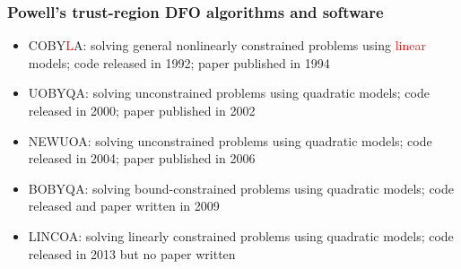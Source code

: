 \documentclass[slidestop,mathserif,xcolor=dvipsnames]{beamer}
\newcommand{\blue}[1]{\textcolor{blue}{#1}}
\newcommand{\red}[1]{\textcolor{red}{#1}}
\begin{document}
\begin{frame}
  \frametitle{Powell's trust-region DFO algorithms and software}

      \begin{itemize}
          \item  COBY\red{L}A: solving general nonlinearly constrained problems using \red{linear} models; code released in 1992; paper published in 1994
      \vspace{0.5ex}

    \item  UOBYQA: solving unconstrained problems using quadratic models; code released in 2000; paper published in 2002
      \vspace{0.5ex}

    \item  NEWUOA: solving unconstrained problems using quadratic models; code released in 2004; paper published in 2006
      \vspace{0.5ex}

    \item  BOBYQA:
       solving bound-constrained problems using
       quadratic models; code released and paper written in 2009

      \vspace{0.5ex}
     \item  LINCOA:
       solving linearly constrained problems using
       quadratic models; code released in 2013 but no paper written

  \end{itemize}
\end{frame}

\end{document}

